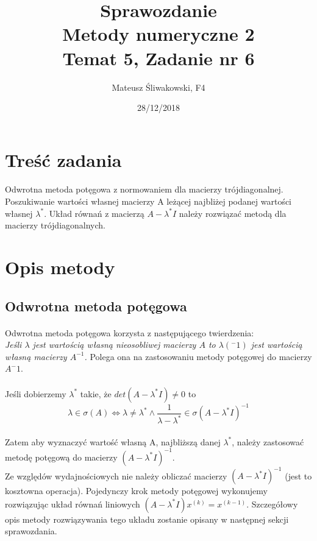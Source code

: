 \documentclass{article}
\title{Sprawozdanie \\Metody numeryczne 2 \\\textbf{Temat 5, Zadanie nr 6}}
\date{28/12/2018}
\author{Mateusz Śliwakowski, F4}
\begin{document}
  \maketitle
 	  \newpage

\section{Treść zadania}
\paragraph{}
Odwrotna metoda potęgowa z normowaniem dla macierzy trójdiagonalnej. Poszukiwanie wartości własnej macierzy A leżącej najbliżej podanej wartości własnej $\lambda^*$. Układ równań z macierzą $A - \lambda^*I$ należy rozwiązać metodą dla macierzy trójdiagonalnych.
\section{Opis metody}
\subsection{Odwrotna metoda potęgowa}
\paragraph{}
Odwrotna metoda potęgowa korzysta z następującego twierdzenia:\\
\textit{Jeśli $\lambda$ jest wartością własną nieosobliwej macierzy $A$ to $\lambda(^-1)$ jest wartością własną macierzy $A^{-1}$.}
Polega ona na zastosowaniu metody potęgowej do macierzy $A^-1$.
\paragraph{}
Jeśli dobierzemy $\lambda^*$ takie, że $det(A-\lambda^{*}I)\neq0$ to $$\lambda \in \sigma(A) \Leftrightarrow \lambda \neq \lambda^{*} \wedge \frac{1}{\lambda-\lambda^{*}} \in \sigma(A-\lambda^* I)^{-1}$$ 
\paragraph{}
Zatem aby wyznaczyć wartość własną A, najbliższą danej $\lambda^*$, należy zastosować metodę potęgową do macierzy $(A-\lambda^*I)^{-1}$.\\
Ze względów wydajnościowych nie należy obliczać macierzy $(A-\lambda^*I)^{-1}$ (jest to kosztowna operacja). Pojedynczy krok metody potęgowej wykonujemy rozwiązując układ równań liniowych $(A - \lambda^*I)x^{(k)} = x^{(k-1)}$. Szczegółowy opis metody rozwiązywania tego układu zostanie opisany w następnej sekcji sprawozdania.
\end{document}
